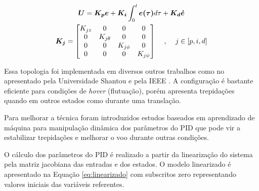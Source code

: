 \documentclass[main.tex]{subfiles}
\begin{document}
\begin{equation}\label{eq:PID}
    \begin{gathered}
        \boldsymbol{U} = \boldsymbol{K_p}\boldsymbol{e} + \boldsymbol{K_i}\int_0^t\boldsymbol{e(\tau)}d\tau + \boldsymbol{K_d}\boldsymbol{\dot{e}}\\
        \boldsymbol{K_j} =\begin{bmatrix}
            K_{jz} & 0 & 0 & 0\\
            0 & K_{j\theta} & 0 & 0\\
            0 & 0 & K_{j\phi} & 0\\
            0 & 0 & 0 & K_{j\psi}
        \end{bmatrix} \hspace{0.4cm} , \hspace{0.4cm} j \in [p, i, d]
    \end{gathered}
\end{equation}

Essa topologia foi implementada em diversos outros trabalhos como no apresentado pela Universidade Shantou \cite{controle:pid} e pela IEEE \cite{controle:pid_modelagem_basica}. A configuração é bastante eficiente para condições de \textit{hover} (flutuação), porém apresenta trepidações quando em outros estados como durante uma translação.

Para melhorar a técnica foram introduzidos estudos baseados em aprendizado de máquina \cite{controle:pid-aprendizado-maquina} para manipulação dinâmica dos parâmetros do PID que pode vir a estabilizar trepidações e melhorar o voo durante outras condições.

O cálculo dos parâmetros do PID é realizado a partir da linearização do sistema pela matriz jacobiana das entradas e dos estados. O modelo linearizado é apresentado na Equação \ref{eq:linearizado} com subscritos zero representando valores iniciais das variáveis referentes.
\end{document}
